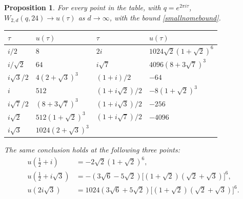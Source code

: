 \documentclass[11pt]{amsart}
\newtheorem{proposition}[theorem]{Proposition}
\theoremstyle{definition}
\theoremstyle{remark}
\numberwithin{equation}{section}
\begin{document}
\begin{proposition}\label{CMtable}
For every point in the table, with $q=e^{2\pi i\tau}$,
$W_{2,d}(q,24)\to u(\tau)$ as $d\to\infty$, with the bound \eqref{smallnomebound}.
\begin{center}
\begin{tabular}{@{}ll@{\qquad}ll@{}}
\toprule
$\tau$ & $u(\tau)$ & $\tau$ & $u(\tau)$\\
\midrule
$i/2$ & $8$ & $2i$ & $1024\sqrt2(1+\sqrt2)^6$\\
$i/\sqrt2$ & $64$ & $i\sqrt7$ & $4096(8+3\sqrt7)^3$\\
$i\sqrt3/2$ & $4(2+\sqrt3)^3$ & $(1+i)/2$ & $-64$\\
$i$ & $512$ & $(1+i\sqrt2)/2$ & $-8(1+\sqrt2)^3$\\
$i\sqrt7/2$ & $(8+3\sqrt7)^3$ & $(1+i\sqrt3)/2$ & $-256$\\
$i\sqrt2$ & $512(1+\sqrt2)^3$ & $(1+i\sqrt7)/2$ & $-4096$\\
$i\sqrt3$ & $1024(2+\sqrt3)^3$ & &\\
\bottomrule
\end{tabular}
\end{center}
The same conclusion holds at the following three points:
\begin{align*}
 u\left(\tfrac12+i\right)
   &=-2\sqrt2(1+\sqrt2)^6,\\
 u\left(\tfrac12+i\sqrt3\right)
   &=-(3\sqrt6-5\sqrt2)
       \bigl[(1+\sqrt2)(\sqrt2+\sqrt3)\bigr]^6,\\
 u(2i\sqrt3)
   &=1024(3\sqrt6+5\sqrt2)
       \bigl[(1+\sqrt2)(\sqrt2+\sqrt3)\bigr]^6.
\end{align*}
\end{proposition}
\end{document}
